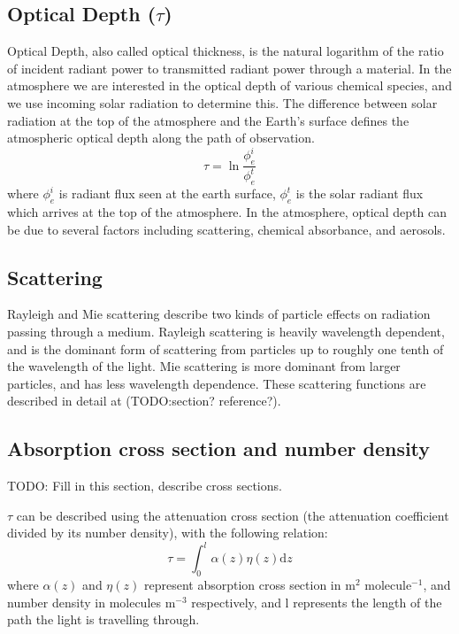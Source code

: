   \subsection{Optical Depth (\texorpdfstring{$\tau$)}{t}}
    \label{ch_HCHO:sec:satelliteHCHO:OpticalDepth}
    
    Optical Depth, also called optical thickness, is the natural logarithm of the ratio of incident radiant power to transmitted radiant power through a material.
    In the atmosphere we are interested in the optical depth of various chemical species, and we use incoming solar radiation to determine this.
    The difference between solar radiation at the top of the atmosphere and the Earth's surface defines the atmospheric optical depth along the path of observation.
    \begin{equation*}
      \tau = \ln{\frac{\phi_e^i}{\phi_e^t}}
    \end{equation*}
    where $\phi_e^i$ is radiant flux seen at the earth surface, $\phi_e^t$ is the solar radiant flux which arrives at the top of the atmosphere.
    In the atmosphere, optical depth can be due to several factors including scattering, chemical absorbance, and aerosols.
  
  \subsection{Scattering}
    \label{ch_HCHO:sec:satelliteHCHO:scattering}
    Rayleigh and Mie scattering describe two kinds of particle effects on radiation passing through a medium. Rayleigh scattering is heavily wavelength dependent, and is the dominant form of scattering from particles up to roughly one tenth of the wavelength of the light. Mie scattering is more dominant from larger particles, and has less wavelength dependence. These scattering functions are described in detail at (TODO:section? reference?).
    
  \subsection{Absorption cross section and number density}
    \label{ch_HCHO:sec:satelliteHCHO:crosssection}
    TODO: Fill in this section, describe cross sections.
    
    
    $\tau$ can be described using the attenuation cross section (the attenuation coefficient divided by its number density), with the following relation:
    \begin{equation*}
      \tau = \int_0^l \alpha(z)\eta(z)\mathrm{d}z
    \end{equation*}
    where $\alpha(z)$ and $\eta(z)$ represent absorption cross section in m$^2$ molecule$^{-1}$, and number density in molecules m$^{-3}$ respectively, and l represents the length of the path the light is travelling through. 
  
